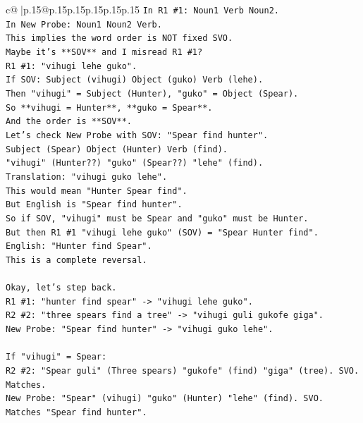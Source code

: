 \documentclass{article}
\begin{document}
{\begin{supertabular}{c@{$\;$}|p{.15\linewidth}@{}p{.15\linewidth}p{.15\linewidth}p{.15\linewidth}p{.15\linewidth}p{.15\linewidth}}
{{{\texttt{In R1 \#1: Noun1 Verb Noun2.} \\
\texttt{In New Probe: Noun1 Noun2 Verb.} \\
\texttt{This implies the word order is NOT fixed SVO.} \\
\texttt{Maybe it's **SOV** and I misread R1 \#1?} \\
\texttt{R1 \#1: "vihugi lehe guko".} \\
\texttt{If SOV: Subject (vihugi) Object (guko) Verb (lehe).} \\
\texttt{Then "vihugi" = Subject (Hunter), "guko" = Object (Spear).} \\
\texttt{So **vihugi = Hunter**, **guko = Spear**.} \\
\texttt{And the order is **SOV**.} \\
\texttt{Let's check New Probe with SOV: "Spear find hunter".} \\
\texttt{Subject (Spear) Object (Hunter) Verb (find).} \\
\texttt{"vihugi" (Hunter??) "guko" (Spear??) "lehe" (find).} \\
\texttt{Translation: "vihugi guko lehe".} \\
\texttt{This would mean "Hunter Spear find".} \\
\texttt{But English is "Spear find hunter".} \\
\texttt{So if SOV, "vihugi" must be Spear and "guko" must be Hunter.} \\
\texttt{But then R1 \#1 "vihugi lehe guko" (SOV) = "Spear Hunter find".} \\
\texttt{English: "Hunter find Spear".} \\
\texttt{This is a complete reversal.} \\
\\ 
\texttt{Okay, let's step back.} \\
\texttt{R1 \#1: "hunter find spear" {-}> "vihugi lehe guko".} \\
\texttt{R2 \#2: "three spears find a tree" {-}> "vihugi guli gukofe giga".} \\
\texttt{New Probe: "Spear find hunter" {-}> "vihugi guko lehe".} \\
\\ 
\texttt{If "vihugi" = Spear:} \\
\texttt{R2 \#2: "Spear guli" (Three spears) "gukofe" (find) "giga" (tree). SVO. Matches.} \\
\texttt{New Probe: "Spear" (vihugi) "guko" (Hunter) "lehe" (find). SVO. Matches "Spear find hunter".} \\
}}}
\end{supertabular}}
\end{document}
